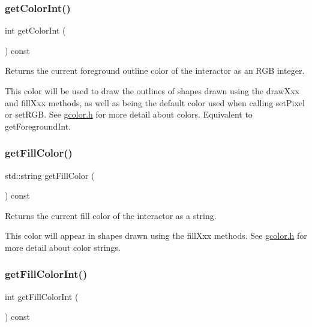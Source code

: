 \subsubsection{\texorpdfstring{get\+Color\+Int()}{getColorInt()}}
{\footnotesize\ttfamily int get\+Color\+Int (\begin{DoxyParamCaption}{ }\end{DoxyParamCaption}) const\hspace{0.3cm}{\ttfamily [virtual]}}



Returns the current foreground outline color of the interactor as an R\+GB integer. 

This color will be used to draw the outlines of shapes drawn using the draw\+Xxx and fill\+Xxx methods, as well as being the default color used when calling set\+Pixel or set\+R\+GB. See \mbox{\hyperlink{gcolor_8h_source}{gcolor.\+h}} for more detail about colors. Equivalent to get\+Foreground\+Int. \mbox{\label{classGDrawingSurface_a76f6964a11fde7c78e9751be184e1a3c}} 
\subsubsection{\texorpdfstring{get\+Fill\+Color()}{getFillColor()}}
{\footnotesize\ttfamily std\+::string get\+Fill\+Color (\begin{DoxyParamCaption}{ }\end{DoxyParamCaption}) const\hspace{0.3cm}{\ttfamily [virtual]}}



Returns the current fill color of the interactor as a string. 

This color will appear in shapes drawn using the fill\+Xxx methods. See \mbox{\hyperlink{gcolor_8h_source}{gcolor.\+h}} for more detail about color strings. \mbox{\label{classGDrawingSurface_a88f4508d9271c4b5f5b5d6b780f223d0}} 
\subsubsection{\texorpdfstring{get\+Fill\+Color\+Int()}{getFillColorInt()}}
{\footnotesize\ttfamily int get\+Fill\+Color\+Int (\begin{DoxyParamCaption}{ }\end{DoxyParamCaption}) const\hspace{0.3cm}{\ttfamily [virtual]}}



